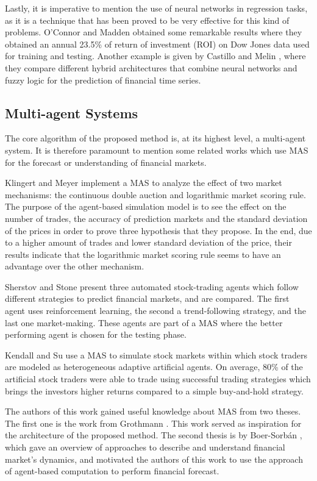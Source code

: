 Lastly, it is imperative to mention the use of neural networks in regression tasks, as it is a technique that has been proved to be very effective for this kind of problems. O'Connor and Madden \cite{Connor2005} obtained some remarkable results where they obtained an annual 23.5\% of return of investment (ROI) on Dow Jones data used for training and testing. Another example is given by Castillo and Melin \cite{castillo2001simulation}, where they compare different hybrid architectures that combine neural networks and fuzzy logic for the prediction of financial time series.

\subsection{Multi-agent Systems}
\label{multi-agent-systems}

The core algorithm of the proposed method is, at its highest level, a multi-agent system. It is therefore paramount to mention some related works which use MAS for the forecast or understanding of financial markets.

Klingert and Meyer \cite{Klingert_2012} implement a MAS to analyze the effect of two market mechanisms: the continuous double auction and logarithmic market scoring rule. The purpose of the agent-based simulation model is to see the effect on the number of trades, the accuracy of prediction markets and the standard deviation of the prices in order to prove three hypothesis that they propose. In the end, due to a higher amount of trades and lower standard deviation of the price, their results indicate that the logarithmic market scoring rule seems to have an advantage over the other mechanism.

Sherstov and Stone \cite{Sherstov2005} present three automated stock-trading agents which follow different strategies to predict financial markets, and are compared. The first agent uses reinforcement learning, the second a trend-following strategy, and the last one market-making. These agents are part of a MAS where the better performing agent is chosen for the testing phase.

Kendall and Su \cite{Kendall2003} use a MAS to simulate stock markets within which stock traders are modeled as heterogeneous adaptive artificial agents. On average, 80\% of the artificial stock traders were able to trade using successful trading strategies which brings the investors higher returns compared to a simple buy-and-hold strategy.

The authors of this work gained useful knowledge about MAS from two theses. The first one is the work from Grothmann \cite{Grothmann2002}. This work served as inspiration for the architecture of the proposed method. The second thesis is by Boer-Sorbán \cite{Boer-Sorban2008}, which gave an overview of approaches to describe and understand financial market's dynamics, and motivated the authors of this work to use the approach of agent-based computation to perform financial forecast.

